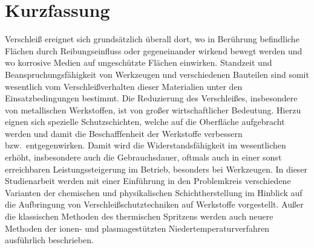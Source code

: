 \documentclass[12pt,a4paper,bibliography=totocnumbered,listof=totocnumbered,fleqn]{scrartcl}
\begin{document}
\setcounter{page}{1}
\onehalfspacing
{}
\section{Kurzfassung}

Verschleiß ereignet sich grundsätzlich überall dort, wo in Berührung befindliche Flächen durch Reibungseinfluss oder gegeneinander wirkend bewegt werden und wo korrosive Medien auf ungeschützte Flächen einwirken.
Standzeit und Beanspruchungsfähigkeit von Werkzeugen und verschiedenen Bauteilen sind somit wesentlich vom Verschleißverhalten dieser Materialien unter den Einsatzbedingungen bestimmt.
Die Reduzierung des Verschleißes, insbesondere von metallischen Werkstoffen, ist von großer wirtschaftlicher Bedeutung.
Hierzu eignen sich spezielle Schutzschichten, welche auf die Oberfläche aufgebracht werden und damit die Beschafffenheit der Werkstoffe verbessern bzw.\ entgegenwirken.
Damit wird die Widerstandsfähigkeit im wesentlichen erhöht, insbesondere auch die Gebrauchsdauer, oftmals auch in einer sonst erreichbaren Leistungssteigerung im Betrieb, besonders bei Werkzeugen.
In dieser Studienarbeit werden mit einer Einführung in den Problemkreis verschiedene Varianten der chemischen und physikalischen Schichtherstellung im Hinblick auf die Aufbringung von Verschleißschutztechniken auf Werkstoffe vorgestellt. Außer die klassischen Methoden des thermischen Spritzens werden auch neuere Methoden der ionen- und plasmagestützten Niedertemperaturverfahren ausführlich beschrieben.

\pagebreak

\renewcommand{\cfttabpresnum}{Tab. }
\renewcommand{\cftfigpresnum}{Abb. }
\settowidth{\cfttabnumwidth}{Abb. 10\quad}
\settowidth{\cftfignumwidth}{Abb. 10\quad}

\singlespacing
{}
\renewcommand{\contentsname}{II Inhaltsverzeichnis}
{}
\addtocounter{section}{1}
\tableofcontents
\pagebreak
{}
\listoffigures
\pagebreak
\listoftables
\pagebreak
\end{document}
